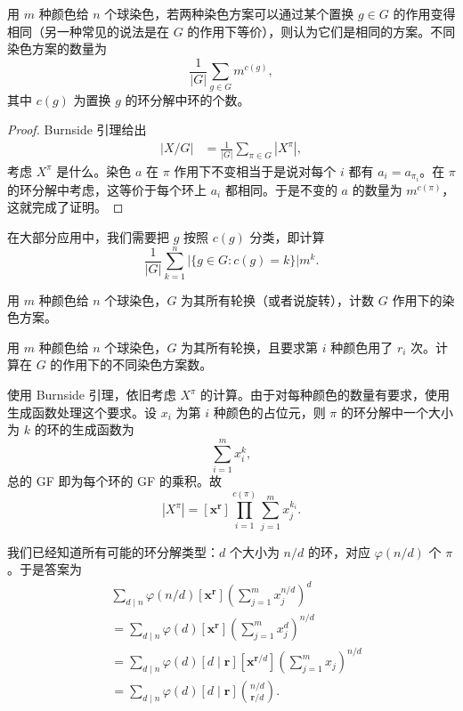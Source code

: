 \begin{corollary}[P\'olya 计数]
    用 $m$ 种颜色给 $n$ 个球染色，若两种染色方案可以通过某个置换 $g\in G$ 的作用变得相同（另一种常见的说法是在 $G$ 的作用下等价），则认为它们是相同的方案。不同染色方案的数量为
    $$
    \frac{1}{|G|}\sum_{g\in G}m^{c(g)},
    $$
    其中 $c(g)$ 为置换 $g$ 的环分解中环的个数。
\end{corollary}
\begin{proof}
    Burnside 引理给出
    $$
    \begin{aligned}
        |X/G|&=\frac{1}{|G|}\sum_{\pi\in G}|X^\pi|,
    \end{aligned}
    $$
    考虑 $X^\pi$ 是什么。染色 $a$ 在 $\pi$ 作用下不变相当于是说对每个 $i$ 都有 $a_i=a_{\pi_i}$。在 $\pi$ 的环分解中考虑，这等价于每个环上 $a_i$ 都相同。于是不变的 $a$ 的数量为 $m^{c(\pi)}$，这就完成了证明。
\end{proof}

在大部分应用中，我们需要把 $g$ 按照 $c(g)$ 分类，即计算
$$
\frac{1}{|G|}\sum_{k=1}^{n}|\{g\in G:c(g)=k\}|m^k.
$$
\begin{example}[{P4980 【模板】P\'olya 定理}]
    用 $m$ 种颜色给 $n$ 个球染色，$G$ 为其所有轮换（或者说旋转），计数 $G$ 作用下的染色方案。
\end{example}

\begin{example}
    用 $m$ 种颜色给 $n$ 个球染色，$G$ 为其所有轮换，且要求第 $i$ 种颜色用了 $r_i$ 次。计算在 $G$ 的作用下的不同染色方案数。
\end{example}
\begin{solution}
    使用 Burnside 引理，依旧考虑 $X^{\pi}$ 的计算。由于对每种颜色的数量有要求，使用生成函数处理这个要求。设 $x_i$ 为第 $i$ 种颜色的占位元，则 $\pi$ 的环分解中一个大小为 $k$ 的环的生成函数为
    $$
    \sum_{i=1}^{m}x_i^k,
    $$
    总的 GF 即为每个环的 GF 的乘积。故 
    $$
    |X^\pi|=[\mathbf x^{\mathbf r}]\prod_{i=1}^{c(\pi)}\sum_{j=1}^{m}x_j^{k_i}.
    $$ 

    我们已经知道所有可能的环分解类型：$d$ 个大小为 $n/d$ 的环，对应 $\varphi(n/d)$ 个 $\pi$。于是答案为
    $$
    \begin{aligned}
    &\sum_{d\mid n}\varphi(n/d)[\mathbf x^{\mathbf r}]\left(\sum_{j=1}^{m}x_j^{n/d}\right)^d\\
    &=\sum_{d\mid n}\varphi(d)[\mathbf x^{\mathbf r}]\left(\sum_{j=1}^{m}x_j^{d}\right)^{n/d}\\
    &=\sum_{d\mid n}\varphi(d)[d\mid \mathbf r][\mathbf x^{\mathbf r/d}]\left(\sum_{j=1}^m x_j\right)^{n/d}\\
    &=\sum_{d\mid n}\varphi(d)[d\mid \mathbf r]\binom{n/d}{\mathbf r/d}.
    \end{aligned}
    $$
\end{solution}
\begin{corollary}
\end{corollary}

